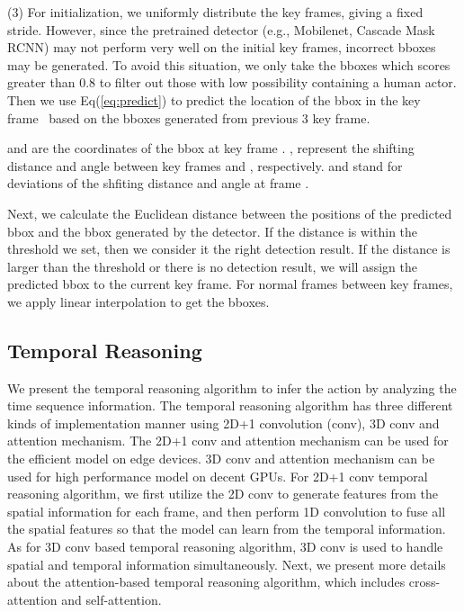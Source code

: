 \documentclass[letterpaper, 10 pt, conference]{ieeeconf}
\begin{document}
    \noindent (3) For initialization, we uniformly distribute the key frames, giving a fixed stride. However, since the pretrained detector (e.g., Mobilenet, Cascade Mask RCNN) may not perform very well on the initial key frames, incorrect bboxes may be generated. To avoid this situation, we only take the bboxes which scores greater than 0.8 to filter out those with low possibility containing a human actor. Then we use Eq(\ref{eq:predict}) to predict the location of the bbox in the key frame~ based on the bboxes generated from previous 3 key frame. 

    
   and  are the coordinates of the bbox at key frame . ,  represent the shifting distance and angle between key frames  and , respectively.  and  stand for deviations of the shfiting distance and angle at frame .
  
  Next, we calculate the Euclidean distance between the positions of the predicted bbox and the bbox generated by the detector. If the distance is within the threshold we set, then we consider it the right detection result. If the distance is larger than the threshold or there is no detection result, we will assign the predicted bbox to the current key frame. For normal frames between key frames, we apply linear interpolation to get the bboxes.







\subsection{Temporal Reasoning}
We present the temporal reasoning algorithm to infer the action by analyzing the time sequence information. The temporal reasoning algorithm has three different kinds of implementation manner using 2D+1 convolution (conv), 3D conv and attention mechanism. The 2D+1 conv and attention mechanism can be used for the efficient model on edge devices. 3D conv and attention mechanism can be used for high performance model on decent GPUs. For 2D+1 conv temporal reasoning algorithm, we first utilize the 2D conv to generate features from the spatial information for each frame, and then perform 1D convolution to fuse all the spatial features so that the model can learn from the temporal information. As for 3D conv based temporal reasoning algorithm, 3D conv is used to handle spatial and temporal information simultaneously. Next, we present more details about the attention-based temporal reasoning algorithm, which includes cross-attention and self-attention.
\end{document}
